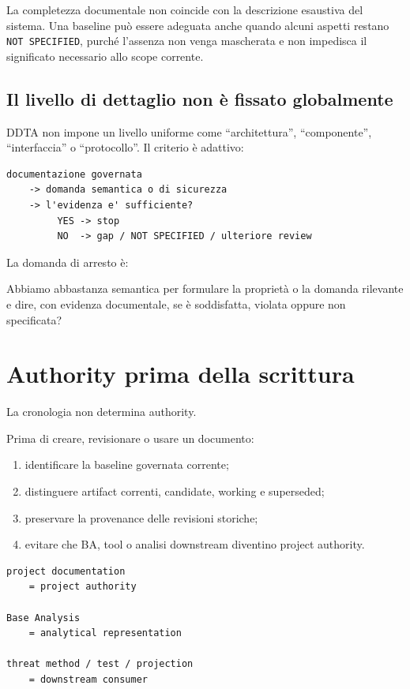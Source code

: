 \documentclass[11pt,a4paper]{article}
\newcommand{\code}[1]{\nolinkurl{#1}}
\begin{document}
La completezza documentale non coincide con la descrizione esaustiva del sistema. Una baseline può essere adeguata anche quando alcuni aspetti restano \code{NOT SPECIFIED}, purché l'assenza non venga mascherata e non impedisca il significato necessario allo scope corrente.

\subsection{Il livello di dettaglio non è fissato globalmente}

DDTA non impone un livello uniforme come ``architettura'', ``componente'', ``interfaccia'' o ``protocollo''. Il criterio è adattivo:

\begin{lstlisting}
documentazione governata
    -> domanda semantica o di sicurezza
    -> l'evidenza e' sufficiente?
         YES -> stop
         NO  -> gap / NOT SPECIFIED / ulteriore review
\end{lstlisting}

La domanda di arresto è:

\begin{conceptbox}
Abbiamo abbastanza semantica per formulare la proprietà o la domanda rilevante e dire, con evidenza documentale, se è soddisfatta, violata oppure non specificata?
\end{conceptbox}

\section{Authority prima della scrittura}

La cronologia non determina authority.

Prima di creare, revisionare o usare un documento:

\begin{enumerate}
\item identificare la baseline governata corrente;
\item distinguere artifact correnti, candidate, working e superseded;
\item preservare la provenance delle revisioni storiche;
\item evitare che BA, tool o analisi downstream diventino project authority.
\end{enumerate}

\begin{lstlisting}
project documentation
    = project authority

Base Analysis
    = analytical representation

threat method / test / projection
    = downstream consumer
\end{lstlisting}
\end{document}
